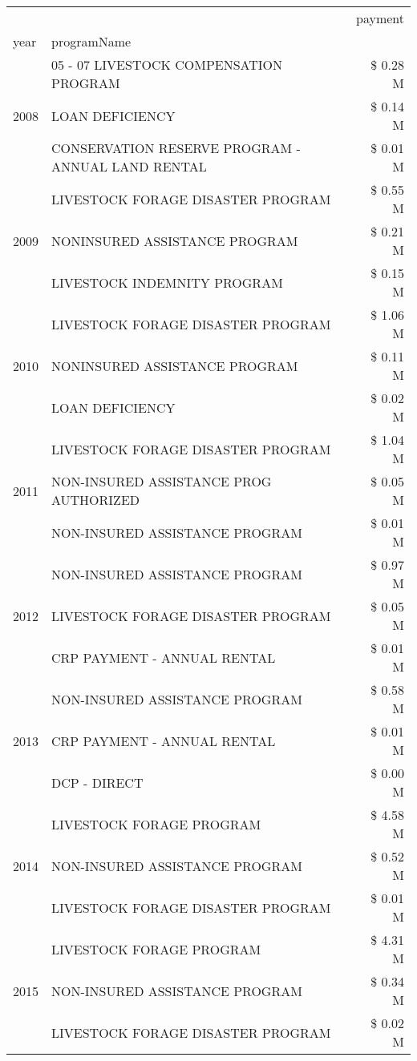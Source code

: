 \begin{tabular}{llr}
\toprule
 &  & payment \\
year & programName &  \\
\midrule
\multirow[t]{3}{*}{2008} & 05 - 07 LIVESTOCK COMPENSATION PROGRAM & \$ 0.28 M \\
 & LOAN DEFICIENCY & \$ 0.14 M \\
 & CONSERVATION RESERVE PROGRAM - ANNUAL LAND RENTAL & \$ 0.01 M \\
\cline{1-3}
\multirow[t]{3}{*}{2009} & LIVESTOCK FORAGE DISASTER  PROGRAM & \$ 0.55 M \\
 & NONINSURED ASSISTANCE PROGRAM & \$ 0.21 M \\
 & LIVESTOCK INDEMNITY PROGRAM & \$ 0.15 M \\
\cline{1-3}
\multirow[t]{3}{*}{2010} & LIVESTOCK FORAGE DISASTER  PROGRAM & \$ 1.06 M \\
 & NONINSURED ASSISTANCE PROGRAM & \$ 0.11 M \\
 & LOAN DEFICIENCY & \$ 0.02 M \\
\cline{1-3}
\multirow[t]{3}{*}{2011} & LIVESTOCK FORAGE DISASTER PROGRAM & \$ 1.04 M \\
 & NON-INSURED ASSISTANCE PROG AUTHORIZED & \$ 0.05 M \\
 & NON-INSURED ASSISTANCE PROGRAM & \$ 0.01 M \\
\cline{1-3}
\multirow[t]{3}{*}{2012} & NON-INSURED ASSISTANCE PROGRAM & \$ 0.97 M \\
 & LIVESTOCK FORAGE DISASTER PROGRAM & \$ 0.05 M \\
 & CRP PAYMENT - ANNUAL RENTAL & \$ 0.01 M \\
\cline{1-3}
\multirow[t]{3}{*}{2013} & NON-INSURED ASSISTANCE PROGRAM & \$ 0.58 M \\
 & CRP PAYMENT - ANNUAL RENTAL & \$ 0.01 M \\
 & DCP - DIRECT & \$ 0.00 M \\
\cline{1-3}
\multirow[t]{3}{*}{2014} & LIVESTOCK FORAGE PROGRAM & \$ 4.58 M \\
 & NON-INSURED ASSISTANCE PROGRAM & \$ 0.52 M \\
 & LIVESTOCK FORAGE DISASTER PROGRAM & \$ 0.01 M \\
\cline{1-3}
\multirow[t]{3}{*}{2015} & LIVESTOCK FORAGE PROGRAM & \$ 4.31 M \\
 & NON-INSURED ASSISTANCE PROGRAM & \$ 0.34 M \\
 & LIVESTOCK FORAGE DISASTER PROGRAM & \$ 0.02 M \\
\cline{1-3}

\end{tabular}

